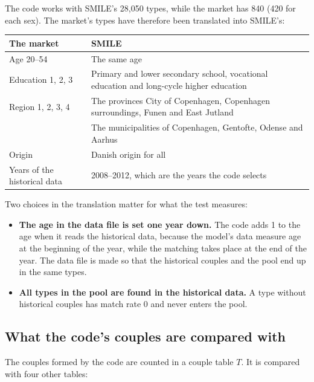 \documentclass[12pt,a4paper]{article}
\begin{document}
The code works with SMILE's 28,050 types, while the market has 840 (420 for each sex). The market's
types have therefore been translated into SMILE's:

\begin{center}
\begin{tabular}{@{}lp{}@{}}
\toprule
The market & SMILE \\
\midrule
Age 20--54 & The same age \\
Education 1, 2, 3 & Primary and lower secondary school, vocational education and long-cycle higher education \\
Region 1, 2, 3, 4 & The provinces City of Copenhagen, Copenhagen surroundings, Funen and East Jutland \\
 & The municipalities of Copenhagen, Gentofte, Odense and Aarhus \\
Origin & Danish origin for all \\
Years of the historical data & 2008--2012, which are the years the code selects \\
\bottomrule
\end{tabular}
\end{center}

Two choices in the translation matter for what the test measures:

\begin{itemize}
\item \textbf{The age in the data file is set one year down.} The code adds 1 to the age when it
reads the historical data, because the model's data measure age at the beginning of the year, while
the matching takes place at the end of the year. The data file is made so that the historical
couples and the pool end up in the same types.
\item \textbf{All types in the pool are found in the historical data.} A type without historical
couples has match rate 0 and never enters the pool.
\end{itemize}

\subsection{What the code's couples are compared with}

The couples formed by the code are counted in a couple table $T$. It is compared with four other
tables:
\end{document}
